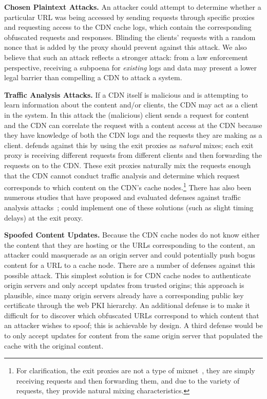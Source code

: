 \textbf{Chosen Plaintext Attacks.} An attacker could attempt to
determine whether a particular URL was being accessed by sending requests
through specific \system{} proxies and requesting access to the CDN cache logs, 
which contain the corresponding obfuscated
requests and responses. Blinding the clients' requests
with a random nonce that is added by the proxy should prevent against this
attack. We also believe that such an attack reflects a stronger attack: from a
law enforcement perspective, receiving a subpoena for {\em existing} logs and
data may present a lower legal barrier than compelling a CDN to attack a
system.

\textbf{Traffic Analysis Attacks.} If a CDN itself is malicious and is attempting 
to learn information about the content and/or clients, the CDN may act as a client 
in the system.  In this attack the (malicious) client sends a request for content 
and the CDN can correlate the request with a content access at the CDN because they have 
knowledge of both the CDN logs and the requests they are making as a client.  \system{} 
defends against this by using the exit proxies as {\it natural} mixes; each exit proxy is receiving 
different requests from different clients and then forwarding the requests on to the CDN.  
These exit proxies naturally mix the requests enough that the CDN cannot conduct traffic analysis
 and determine which request corresponds to which content on the CDN's cache nodes.\footnote{For clarification, the exit proxies 
are not a type of mixnet~\cite{chaum1981untraceable}, they are simply receiving requests and then forwarding them, and due to the variety of 
requests, they provide natural mixing characteristics.}  There has 
also been numerous studies that have proposed and evaluated defenses against traffic 
analysis attacks~\cite{wright2009traffic,rackoff1993cryptographic}; \system{} could implement one of these solutions (such as slight timing delays) at the exit 
proxy.

\textbf{Spoofed Content Updates.} Because the CDN cache
nodes do not know either the content that they are hosting or the URLs
corresponding to the content, an attacker could masquerade as an origin server
and could potentially push bogus content for a URL to a cache node. There are
a number of defenses against this possible attack. This simplest solution is
for CDN cache nodes to authenticate origin servers and only accept updates
from trusted origins; this approach is plausible, since many origin servers already
have a corresponding public key certificate through the web PKI hierarchy.  An additional
defense is to make it difficult for to discover which obfuscated URLs correspond
to which content that an attacker wishes to spoof; this is achievable by design.
A third defense would be to only accept updates for content from the same origin
server that populated the cache with the original content.

